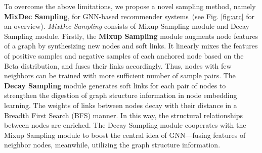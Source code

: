 

 To overcome the above limitations, we propose a novel sampling method, namely \textbf{MixDec Sampling}, for GNN-based recommender systems~(see Fig. \ref{fig:arc} for an overview).
 \emph{MixDec Sampling} consists of Mixup Sampling module and Decay Sampling module. Firstly, the \textbf{Mixup Sampling} module augments node features of a graph by synthesizing new nodes and soft links.  It linearly mixes the features of positive samples and negative samples of each anchored node based on the Beta distribution, and fuses their links accordingly. Thus, nodes with few neighbors can be trained with more sufficient number of sample pairs. The \textbf{Decay Sampling} module generates soft links for each pair of nodes to strengthen the digestion of graph structure information in node embedding learning. The weights of links between nodes decay with their distance in a Breadth First Search (BFS) manner. In this way, the 
structural relationships between nodes are enriched. The Decay Sampling module cooperates with the Mixup Sampling module to boost the central idea of GNN---fusing features of neighbor nodes, meanwhile, utilizing the graph structure information.


